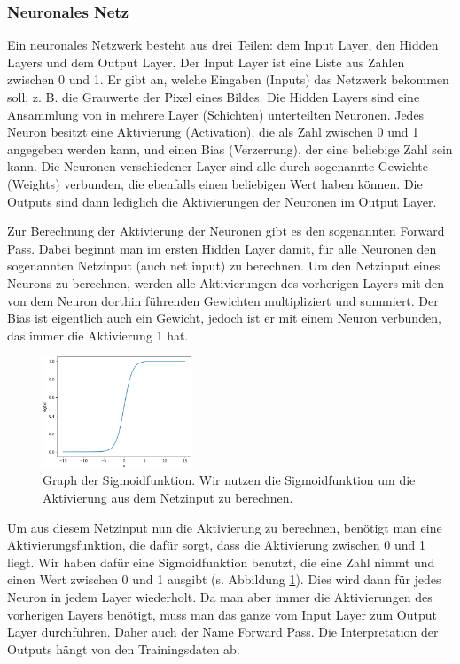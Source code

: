 \documentclass[11pt]{scrartcl}
\begin{document}
	\subsubsection{Neuronales Netz}

	Ein neuronales Netzwerk besteht aus drei Teilen: dem Input Layer, den Hidden Layers und dem Output Layer. 
	Der Input Layer ist eine Liste aus Zahlen zwischen 0 und 1. Er gibt an, welche Eingaben (Inputs) das Netzwerk bekommen soll, z. B. die Grauwerte der Pixel eines Bildes.
	Die Hidden Layers sind eine Ansammlung von in mehrere Layer (Schichten) unterteilten Neuronen.
	Jedes Neuron besitzt eine Aktivierung (Activation), die als Zahl zwischen 0 und 1 angegeben werden kann, und einen Bias (Verzerrung), der eine beliebige Zahl sein kann. Die Neuronen verschiedener Layer sind alle durch sogenannte Gewichte (Weights) verbunden, die ebenfalls einen beliebigen Wert haben können.
	Die Outputs sind dann lediglich die Aktivierungen der Neuronen im Output Layer.


	Zur Berechnung der Aktivierung der Neuronen gibt es den sogenannten Forward Pass. Dabei beginnt man im ersten Hidden Layer damit, für alle Neuronen den sogenannten Netzinput (auch net input) zu berechnen. Um den Netzinput eines Neurons zu berechnen, werden alle Aktivierungen des vorherigen Layers mit den von dem Neuron dorthin führenden Gewichten multipliziert und summiert. Der Bias ist eigentlich auch ein Gewicht, jedoch ist er mit einem Neuron verbunden, das immer die Aktivierung 1 hat.

	\begin{figure}
		\centering
		\vspace*{-5mm}
		\includegraphics[width=0.4\textwidth]{pictures/sig_func.png}
		\caption{Graph der Sigmoidfunktion. Wir nutzen die Sigmoidfunktion um die Aktivierung aus dem Netzinput zu berechnen.}
		\label{sig_func}
	\end{figure}

	Um aus diesem Netzinput nun die Aktivierung zu berechnen, benötigt man eine Aktivierungsfunktion, die dafür sorgt, dass die Aktivierung zwischen 0 und 1 liegt. Wir haben dafür eine Sigmoidfunktion benutzt, die eine Zahl nimmt und einen Wert zwischen 0 und 1 ausgibt (s. Abbildung \ref{sig_func}). Dies wird dann für jedes Neuron in jedem Layer wiederholt. Da man aber immer die Aktivierungen des vorherigen Layers benötigt, muss man das ganze vom Input Layer zum Output Layer durchführen. Daher auch der Name Forward Pass. Die Interpretation der Outputs hängt von den Trainingsdaten ab.
\end{document}
